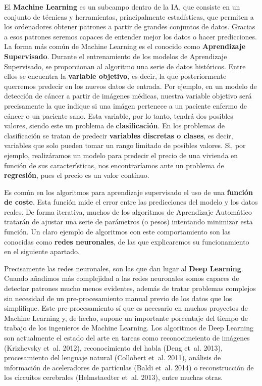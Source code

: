\documentclass[
  12pt,
  spanish,
  a4paperpaper,
]{report}
\begin{document}
El \textbf{Machine Learning} es un subcampo dentro de la IA, que
consiste en un conjunto de técnicas y herramientas, principalmente
estadísticas, que permiten a los ordenadores obtener patrones a partir
de grandes conjuntos de datos. Gracias a esos patrones seremos capaces
de entender mejor los datos o hacer predicciones. La forma más común de
Machine Learning es el conocido como \textbf{Aprendizaje Supervisado}.
Durante el entrenamiento de los modelos de Aprendizaje Supervisado, se
proporcionan al algoritmo una serie de datos históricos. Entre ellos se
encuentra la \textbf{variable objetivo}, es decir, la que posteriormente
querremos predecir en los nuevos datos de entrada. Por ejemplo, en un
modelo de detección de cáncer a partir de imágenes médicas, nuestra
variable objetivo será precisamente la que indique si una imágen
pertenece a un paciente enfermo de cáncer o un paciente sano. Esta
variable, por lo tanto, tendrá dos posibles valores, siendo este un
problema de \textbf{clasificación}. En los problemas de clasificación se
tratan de predecir \textbf{variables discretas o clases}, es decir,
variables que solo pueden tomar un rango limitado de posibles valores.
Si, por ejemplo, realizáramos un modelo para predecir el precio de una
vivienda en función de sus características, nos encontraríamos ante un
problema de \textbf{regresión}, pues el precio es un valor contínuo.

Es común en los algoritmos para aprendizaje supervisado el uso de una
\textbf{función de coste}. Esta función mide el error entre las
predicciones del modelo y los datos reales. De forma iterativa, muchos
de los algoritmos de Aprendizaje Automático tratarán de ajustar una
serie de parámetros (o pesos) intentando minimizar esta función. Un
claro ejemplo de algoritmos con este comportamiento son las conocidas
como \textbf{redes neuronales}, de las que explicaremos su
funcionamiento en el siguiente apartado.

Precisamente las redes neuronales, son las que dan lugar al \textbf{Deep
Learning}. Cuando añadimos más complejidad a las redes neuronales somos
capaces de detectar patrones mucho menos evidentes, además de tratar
problemas complejos sin necesidad de un pre-procesamiento manual previo
de los datos que los simplifique. Este pre-procesamiento sí que es
necesario en muchos proyectos de Machine Learning y, de hecho, supone un
importante porcentaje del tiempo de trabajo de los ingenieros de Machine
Learning. Los algoritmos de Deep Learning son actualmente el estado del
arte en tareas como reconocimeiento de imágenes (Krizhevsky et~al.
2012), reconocimiento del habla (Deng et~al. 2013), procesamiento del
lenguaje natural (Collobert et~al. 2011), análisis de información de
aceleradores de partículas (Baldi et~al. 2014) o reconstrucción de los
circuitos cerebrales (Helmstaedter et~al. 2013), entre muchas otras.
\end{document}

